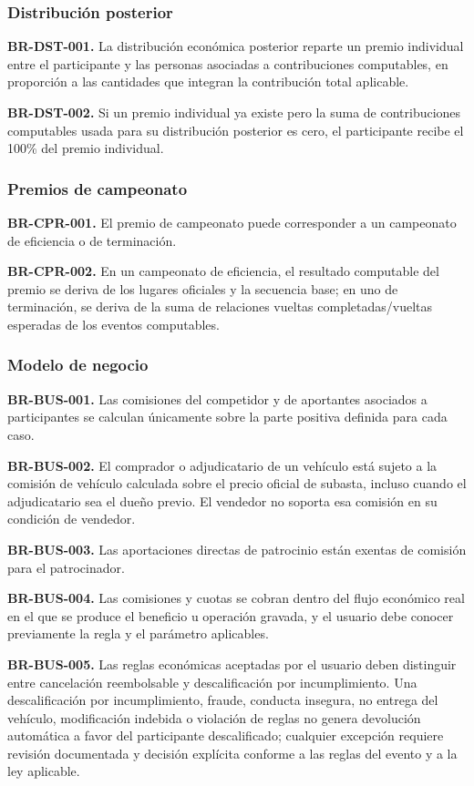\documentclass[10pt,letterpaper]{article}
\begin{document}
\subsubsection{Distribución posterior}
\noindent\textbf{BR-DST-001.} La distribución económica posterior reparte un premio individual entre el participante y las personas asociadas a contribuciones computables, en proporción a las cantidades que integran la contribución total aplicable.\par
\noindent\textbf{BR-DST-002.} Si un premio individual ya existe pero la suma de contribuciones computables usada para su distribución posterior es cero, el participante recibe el 100\% del premio individual.\par
\subsubsection{Premios de campeonato}
\noindent\textbf{BR-CPR-001.} El premio de campeonato puede corresponder a un campeonato de eficiencia o de terminación.\par
\noindent\textbf{BR-CPR-002.} En un campeonato de eficiencia, el resultado computable del premio se deriva de los lugares oficiales y la secuencia base; en uno de terminación, se deriva de la suma de relaciones vueltas completadas/vueltas esperadas de los eventos computables.\par
\subsubsection{Modelo de negocio}
\noindent\textbf{BR-BUS-001.} Las comisiones del competidor y de aportantes asociados a participantes se calculan únicamente sobre la parte positiva definida para cada caso.\par
\noindent\textbf{BR-BUS-002.} El comprador o adjudicatario de un vehículo está sujeto a la comisión de vehículo calculada sobre el precio oficial de subasta, incluso cuando el adjudicatario sea el dueño previo. El vendedor no soporta esa comisión en su condición de vendedor.\par
\noindent\textbf{BR-BUS-003.} Las aportaciones directas de patrocinio están exentas de comisión para el patrocinador.\par
\noindent\textbf{BR-BUS-004.} Las comisiones y cuotas se cobran dentro del flujo económico real en el que se produce el beneficio u operación gravada, y el usuario debe conocer previamente la regla y el parámetro aplicables.\par
\noindent\textbf{BR-BUS-005.} Las reglas económicas aceptadas por el usuario deben distinguir entre cancelación reembolsable y descalificación por incumplimiento. Una descalificación por incumplimiento, fraude, conducta insegura, no entrega del vehículo, modificación indebida o violación de reglas no genera devolución automática a favor del participante descalificado; cualquier excepción requiere revisión documentada y decisión explícita conforme a las reglas del evento y a la ley aplicable.\par
\end{document}
